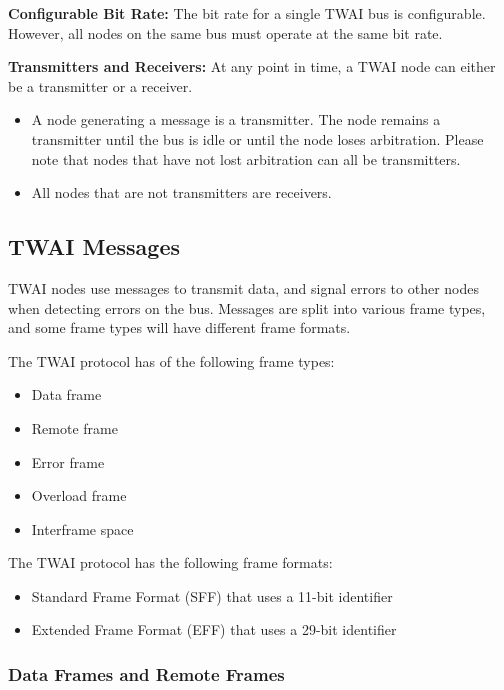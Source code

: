 \documentclass[main\_\_EN.tex]{subfiles}
\begin{document}
{\bfseries 
Configurable Bit Rate:} The bit rate for a single TWAI bus is configurable. However, all nodes on the same bus must operate at the same bit rate.

{\bfseries Transmitters and Receivers:} At any point in time, a TWAI node can either be a transmitter or a receiver.
\begin{itemize}
    \item A node generating a message is a transmitter. The node remains a transmitter until the bus is idle or until the node loses arbitration. Please note that nodes that have not lost arbitration can all be transmitters.
    \item All nodes that are not transmitters are receivers.
\end{itemize}

\subsection{TWAI Messages}
\label{sec:twai-messages}

TWAI nodes use messages to transmit data, and signal errors to other nodes when detecting errors on the bus. Messages are split into various frame types, and some frame types will have different frame formats. 

The TWAI protocol has of the following frame types:

\begin{itemize}
    \item Data frame
    \item Remote frame
    \item Error frame
    \item Overload frame
    \item Interframe space
\end{itemize}

The TWAI protocol has the following frame formats:

\begin{itemize}
    \item Standard Frame Format (SFF) that uses a 11-bit identifier
    \item Extended Frame Format (EFF) that uses a 29-bit identifier
\end{itemize}

\subsubsection{Data Frames and Remote Frames}
\end{document}
